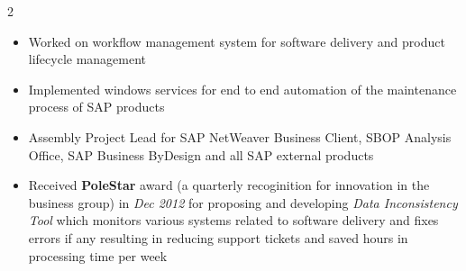\documentclass{article}
\begin{document}
\begin{parcolumns}[sloppy=true,sloppyspaces=true,colwidths={1=.3\textwidth,2=.7\textwidth},rulebetween=true]{2}
{\begin{itemize}[noitemsep,nolistsep]
\item Worked on workflow management system for software delivery and product lifecycle management
\item Implemented windows services for end to end automation of the maintenance process of SAP products
\item Assembly Project Lead for SAP NetWeaver Business Client, SBOP Analysis Office, SAP Business ByDesign and all SAP external products
\item Received \textbf{PoleStar} award (a quarterly recoginition for innovation in the business group) in \textit{Dec 2012} for proposing and developing \textit{Data Inconsistency Tool} which monitors various systems related to software delivery and fixes errors if any resulting in reducing support tickets and saved hours in processing time per week
\end{itemize}
}

\end{parcolumns}
\end{document}
